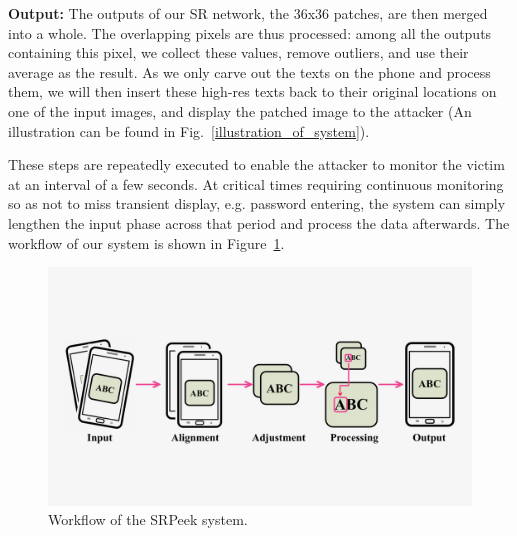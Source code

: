 \vspace{1mm}
\noindent
\textbf{Output:} The outputs of our SR network, the 36x36 patches, are then merged into a whole. The overlapping pixels are thus processed: among all the outputs containing this pixel, we collect these values, remove outliers, and use their average as the result. As we only carve out the texts on the phone and process them, we will then insert these high-res texts back to their original locations on one of the input images, and display the patched image to the attacker (An illustration can be found in Fig.~\ref{illustration_of_system}).

These steps are repeatedly executed to enable the attacker to monitor the victim at an interval of a few seconds. At critical times requiring continuous monitoring so as not to miss transient display, e.g. password entering, the system can simply lengthen the input phase across that period and process the data afterwards. The workflow of our system is shown in Figure~\ref{fig-workflow}.
\begin{figure}
  \centering
     \includegraphics[width=0.90\linewidth]{./pic/workflow_cl.pdf}
     \caption{Workflow of the \textsf{SRPeek} system.}
     \label{fig-workflow}
\end{figure}


